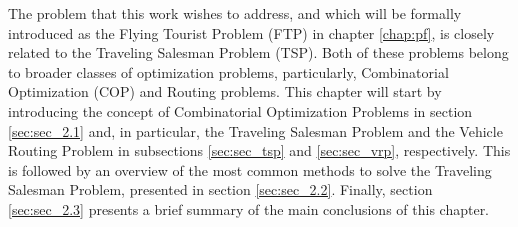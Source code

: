 
The problem that this work wishes to address, and which will be formally introduced as the Flying Tourist Problem (FTP) in chapter \ref{chap:pf}, is closely related to the Traveling Salesman Problem (TSP). Both of these problems belong to broader classes of optimization problems, particularly, Combinatorial Optimization (COP) and Routing problems. This chapter will start by introducing the concept of Combinatorial Optimization Problems in section \ref{sec:sec_2.1} and, in particular, the Traveling Salesman Problem  and the Vehicle Routing Problem in subsections \ref{sec:sec_tsp} and \ref{sec:sec_vrp}, respectively. This is followed by an overview of the most common methods to solve the Traveling Salesman Problem, presented in section \ref{sec:sec_2.2}. Finally, section \ref{sec:sec_2.3} presents a brief summary of the main conclusions of this chapter.
